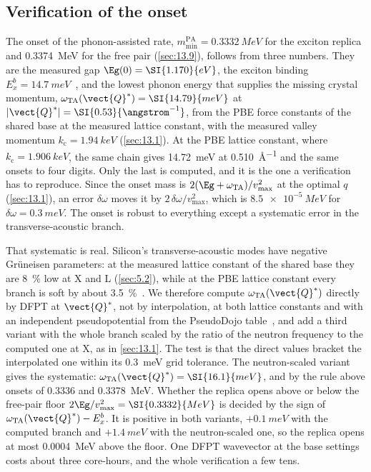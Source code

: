 \subsection{Verification of the onset}

The onset of the phonon-assisted rate, $m_{\mathrm{min}}^{\mathrm{PA}} = \SI{0.3332}{MeV}$ for the exciton replica and \SI{0.3374}{MeV} for the free pair (\cref{sec:13.9}), follows from three numbers. They are the measured gap $\Eg(0) = \SI{1.170}{eV}$, the exciton binding $E_x^b = \SI{14.7}{meV}$~\cite{shaklee1970valley}, and the lowest phonon energy that supplies the missing crystal momentum, $\omega_{\mathrm{TA}}(\vect{Q}^*) = \SI{14.79}{meV}$ at $|\vect{Q}^*| = \SI{0.53}{\angstrom^{-1}}$, from the PBE force constants of the shared base at the measured lattice constant, with the measured valley momentum $k_{\mathrm{c}} = \SI{1.94}{keV}$ (\cref{sec:13.1}). At the PBE lattice constant, where $k_{\mathrm{c}} = \SI{1.906}{keV}$, the same chain gives \SI{14.72}{meV} at \SI{0.510}{\angstrom^{-1}} and the same onsets to four digits. Only the last is computed, and it is the one a verification has to reproduce. Since the onset mass is $2(\Eg + \omega_{\mathrm{TA}})/v_{\mathrm{max}}^2$ at the optimal $q$ (\cref{sec:13.1}), an error $\delta\omega$ moves it by $2\,\delta\omega/v_{\mathrm{max}}^2$, which is $\SI{8.5e-5}{MeV}$ for $\delta\omega = \SI{0.3}{meV}$. The onset is robust to everything except a systematic error in the transverse-acoustic branch.

That systematic is real. Silicon's transverse-acoustic modes have negative Gr\"uneisen parameters: at the measured lattice constant of the shared base they are \SI{8}{\percent} low at X and L (\cref{sec:5.2}), while at the PBE lattice constant every branch is soft by about \SI{3.5}{\percent}~\cite{nilsson1972study}. We therefore compute $\omega_{\mathrm{TA}}(\vect{Q}^*)$ directly by DFPT at $\vect{Q}^*$, not by interpolation, at both lattice constants and with an independent pseudopotential from the PseudoDojo table~\cite{vansetten2018pseudodojo}, and add a third variant with the whole branch scaled by the ratio of the neutron frequency to the computed one at X, as in \cref{sec:13.1}. The test is that the direct values bracket the interpolated one within its \SI{0.3}{meV} grid tolerance. The neutron-scaled variant gives the systematic: $\omega_{\mathrm{TA}}(\vect{Q}^*) = \SI{16.1}{meV}$, and by the rule above onsets of 0.3336 and \SI{0.3378}{MeV}. Whether the replica opens above or below the free-pair floor $2\Eg/v_{\mathrm{max}}^2 = \SI{0.3332}{MeV}$ is decided by the sign of $\omega_{\mathrm{TA}}(\vect{Q}^*) - E_x^b$. It is positive in both variants, $+\SI{0.1}{meV}$ with the computed branch and $+\SI{1.4}{meV}$ with the neutron-scaled one, so the replica opens at most \SI{0.0004}{MeV} above the floor. One DFPT wavevector at the base settings costs about three core-hours, and the whole verification a few tens.

